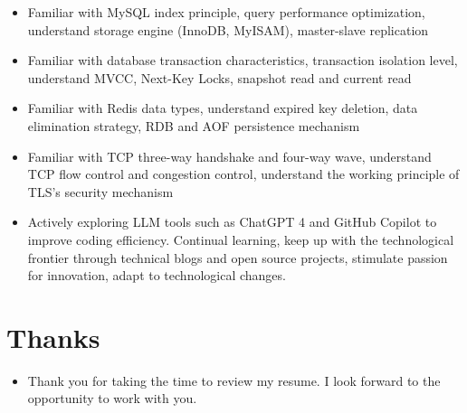 \documentclass{resume}
\newcommand{\en}[1]{#1}
\newcommand{\zh}[1]{}
\begin{document}
\begin{itemize}[parsep=0.25ex]
      \item \en{Familiar with MySQL index principle, query performance optimization, understand storage engine (InnoDB, MyISAM), master-slave replication}
            \zh{熟悉 MySQL 索引原理、查询性能优化，了解存储引擎 (InnoDB、MyISAM)、主从复制}

      \item \en{Familiar with database transaction characteristics, transaction isolation level, understand MVCC, Next-Key Locks, snapshot read and current read}
            \zh{熟悉数据库事务特性、事务隔离级别，了解 MVCC、Next-Key Locks、快照读与当前读}

      \item \en{Familiar with Redis data types, understand expired key deletion, data elimination strategy, RDB and AOF persistence mechanism}
            \zh{熟悉 Redis 数据类型，了解过期键删除、数据淘汰策略、RDB 和 AOF 持久化机制}

      \item \en{Familiar with TCP three-way handshake and four-way wave, understand TCP flow control and congestion control, understand the working principle of TLS's security mechanism}
            \zh{熟悉 TCP 三次握手和四次挥手，了解 TCP 流量控制和拥塞控制，了解 TLS的安全机制的工作原理}

      \item \en{Actively exploring LLM tools such as ChatGPT 4 and GitHub Copilot to improve coding efficiency. Continual learning, keep up with the technological frontier through technical blogs and open source projects, stimulate passion for innovation, adapt to technological changes.}
            \zh{积极探索如ChatGPT 4和GitHub Copilot等LLM工具，提升编码效率。持续学习，通过技术博客、开源项目保持技术前沿，激发创新热情，适应技术变革。}
\end{itemize}

\section{\en{Thanks}\zh{致谢}}
\begin{itemize}
      \item \en{Thank you for taking the time to review my resume. I look forward to the opportunity to work with you.}
            \zh{感谢您花时间阅读我的简历，期待能有机会和您共事}
\end{itemize}
\end{document}
